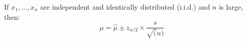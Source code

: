 \begin{multicols}{3}
      \par If $x_1, \ldots, x_n$ are independent and identically distributed (i.i.d.) and $n$ is large, then:
        \[
          \mu = \hat{\mu} \pm z_{\alpha / 2} \times \frac{s}{\sqrt(n)}
        \]

\end{multicols}

\clearpage